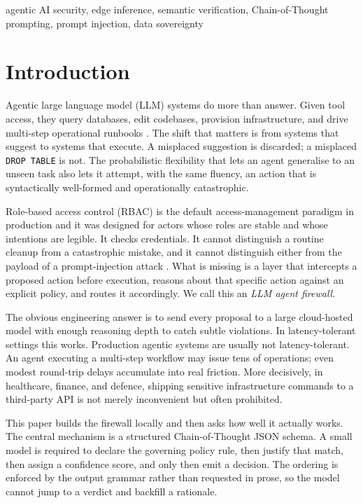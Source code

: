 \documentclass[conference]{IEEEtran}
\begin{document}
\begin{IEEEkeywords}
agentic AI security, edge inference, semantic verification, Chain-of-Thought prompting, prompt injection, data sovereignty
\end{IEEEkeywords}

\section{Introduction}

Agentic large language model (LLM) systems do more than answer. Given tool access, they query databases, edit codebases, provision infrastructure, and drive multi-step operational runbooks \cite{brown2020,ouyang2022,schick2023,yao2023,wu2023,park2023}. The shift that matters is from systems that suggest to systems that execute. A misplaced suggestion is discarded; a misplaced \texttt{DROP TABLE} is not. The probabilistic flexibility that lets an agent generalise to an unseen task also lets it attempt, with the same fluency, an action that is syntactically well-formed and operationally catastrophic.

Role-based access control (RBAC) is the default access-management paradigm in production and it was designed for actors whose roles are stable and whose intentions are legible. It checks credentials. It cannot distinguish a routine cleanup from a catastrophic mistake, and it cannot distinguish either from the payload of a prompt-injection attack \cite{greshake2023}. What is missing is a layer that intercepts a proposed action before execution, reasons about that specific action against an explicit policy, and routes it accordingly. We call this an \emph{LLM agent firewall}.

The obvious engineering answer is to send every proposal to a large cloud-hosted model with enough reasoning depth to catch subtle violations. In latency-tolerant settings this works. Production agentic systems are usually not latency-tolerant. An agent executing a multi-step workflow may issue tens of operations; even modest round-trip delays accumulate into real friction. More decisively, in healthcare, finance, and defence, shipping sensitive infrastructure commands to a third-party API is not merely inconvenient but often prohibited.

This paper builds the firewall locally and then asks how well it actually works. The central mechanism is a structured Chain-of-Thought JSON schema. A small model is required to declare the governing policy rule, then justify that match, then assign a confidence score, and only then emit a decision. The ordering is enforced by the output grammar rather than requested in prose, so the model cannot jump to a verdict and backfill a rationale.
\end{document}
